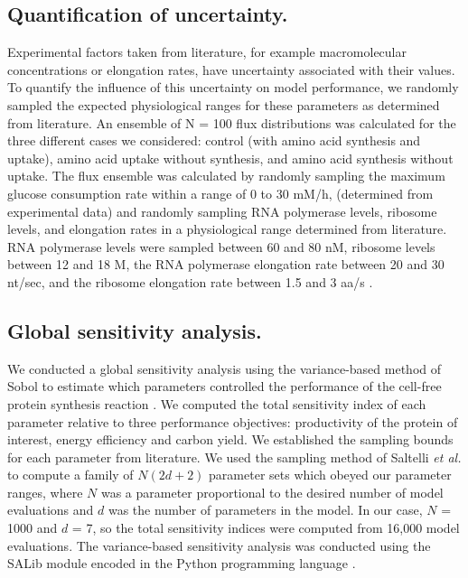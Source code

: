\documentclass[journal=asbcd6,manuscript=article]{achemso}
\begin{document}
\subsection*{Quantification of uncertainty.}
Experimental factors taken from literature, for example macromolecular concentrations or elongation rates, have uncertainty associated with their values.
To quantify the influence of this uncertainty on model performance, we randomly sampled the expected physiological ranges for these parameters as determined from literature.
An ensemble of N = 100 flux distributions was calculated for the three different cases we considered:
control (with amino acid synthesis and uptake), amino acid uptake without synthesis, and amino acid synthesis without uptake.
The flux ensemble was calculated by randomly sampling the maximum glucose consumption rate within a range of 0 to 30 mM/h, (determined from experimental data)
and randomly sampling RNA polymerase levels, ribosome levels, and elongation rates in a physiological range determined from literature.
RNA polymerase levels were sampled between 60 and 80 nM, ribosome levels between 12 and 18 \textmu M, the RNA polymerase elongation rate between 20 and 30 nt/sec, and the ribosome elongation rate between 1.5 and 3 aa/s \cite{2005_underwood_biotech, Garamella:2016aa}.

\subsection*{Global sensitivity analysis.}
We conducted a global sensitivity analysis using the variance-based method of Sobol to estimate which parameters controlled the performance of the cell-free protein synthesis reaction \citep{SOBOL_METHOD}.
We computed the total sensitivity index of each parameter relative to three performance objectives: productivity of the protein of interest, energy efficiency and carbon yield.
We established the sampling bounds for each parameter from literature.
We used the sampling method of Saltelli \textit{et al.} \citep{Saltelli:2010} to compute a family of $N\left(2d+2\right)$ parameter sets which obeyed our parameter ranges,
where $N$ was a parameter proportional to the desired number of model evaluations and $d$ was the number of parameters in the model. In our case, $N$ = 1000 and $d$ = 7, so the total sensitivity indices were computed from 16,000 model evaluations. The variance-based sensitivity analysis was conducted using the SALib module encoded in the Python programming language \citep{SALIB}.
\end{document}
